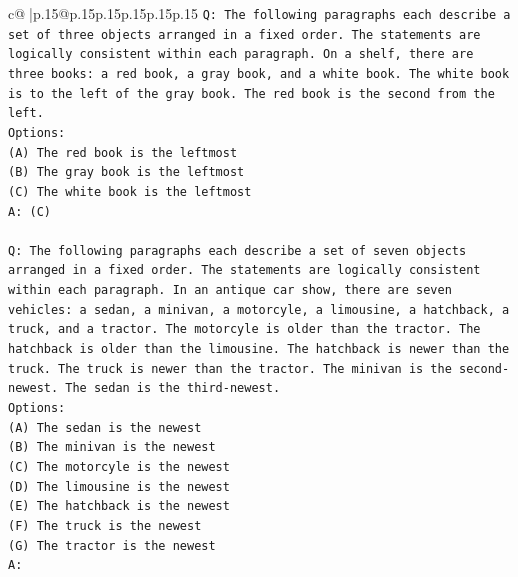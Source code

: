 \documentclass{article}
\begin{document}
{\begin{supertabular}{c@{$\;$}|p{.15\linewidth}@{}p{.15\linewidth}p{.15\linewidth}p{.15\linewidth}p{.15\linewidth}p{.15\linewidth}}
{{{\texttt{Q: The following paragraphs each describe a set of three objects arranged in a fixed order. The statements are logically consistent within each paragraph. On a shelf, there are three books: a red book, a gray book, and a white book. The white book is to the left of the gray book. The red book is the second from the left.} \\
\texttt{Options:} \\
\texttt{(A) The red book is the leftmost} \\
\texttt{(B) The gray book is the leftmost} \\
\texttt{(C) The white book is the leftmost} \\
\texttt{A: (C)} \\
\\ 
\texttt{Q: The following paragraphs each describe a set of seven objects arranged in a fixed order. The statements are logically consistent within each paragraph. In an antique car show, there are seven vehicles: a sedan, a minivan, a motorcyle, a limousine, a hatchback, a truck, and a tractor. The motorcyle is older than the tractor. The hatchback is older than the limousine. The hatchback is newer than the truck. The truck is newer than the tractor. The minivan is the second{-}newest. The sedan is the third{-}newest.} \\
\texttt{Options:} \\
\texttt{(A) The sedan is the newest} \\
\texttt{(B) The minivan is the newest} \\
\texttt{(C) The motorcyle is the newest} \\
\texttt{(D) The limousine is the newest} \\
\texttt{(E) The hatchback is the newest} \\
\texttt{(F) The truck is the newest} \\
\texttt{(G) The tractor is the newest} \\
\texttt{A:} \\
            }
        }
    }
     \\ \\


\end{supertabular}}
\end{document}

